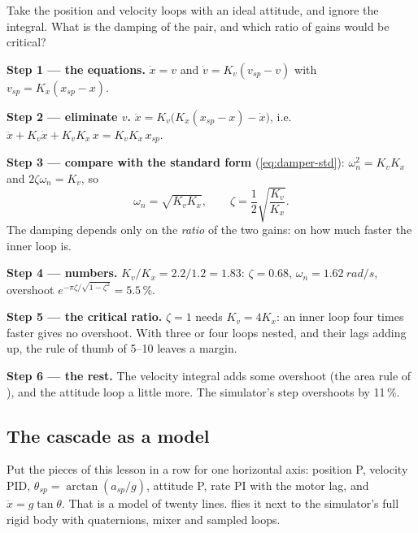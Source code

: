 \begin{example}
\label{ex:cascade-nested}
Take the position and velocity loops with an ideal attitude, and ignore the integral. What is the damping of the pair, and which ratio of gains would be critical?

\textbf{Step 1 — the equations.} $\dot x = v$ and $\dot v = K_v(v_{sp} - v)$ with $v_{sp} = K_x(x_{sp} - x)$.

\textbf{Step 2 — eliminate $v$.} $\ddot x = K_v\big(K_x(x_{sp} - x) - \dot x\big)$, i.e.\ $\ddot x + K_v\dot x + K_vK_x\,x = K_vK_x\,x_{sp}$.

\textbf{Step 3 — compare with the standard form} (\cref{eq:damper-std}): $\omega_n^2 = K_vK_x$ and $2\zeta\omega_n = K_v$, so
\begin{equation}\label{eq:cascade-zeta}
  \omega_n = \sqrt{K_vK_x}, \qquad \zeta = \frac12\sqrt{\frac{K_v}{K_x}} .
\end{equation}
The damping depends only on the \emph{ratio} of the two gains: on how much faster the inner loop is.

\textbf{Step 4 — numbers.} $K_v/K_x = 2.2/1.2 = 1.83$: $\zeta = 0.68$, $\omega_n = \SI{1.62}{rad/s}$, overshoot $e^{-\pi\zeta/\sqrt{1 - \zeta^2}} = 5.5\,\%$.

\textbf{Step 5 — the critical ratio.} $\zeta = 1$ needs $K_v = 4K_x$: an inner loop four times faster gives no overshoot. With three or four loops nested, and their lags adding up, the rule of thumb of 5–10 leaves a margin.

\textbf{Step 6 — the rest.} The velocity integral adds some overshoot (the area rule of ), and the attitude loop a little more. The simulator's step overshoots by 11\,\%.
\end{example}

\subsection{The cascade as a model}
Put the pieces of this lesson in a row for one horizontal axis: position P, velocity PID, $\theta_{sp} = \arctan(a_{sp}/g)$, attitude P, rate PI with the motor lag, and $\ddot x = g\tan\theta$. That is a model of twenty lines.  flies it next to the simulator's full rigid body with quaternions, mixer and sampled loops.

